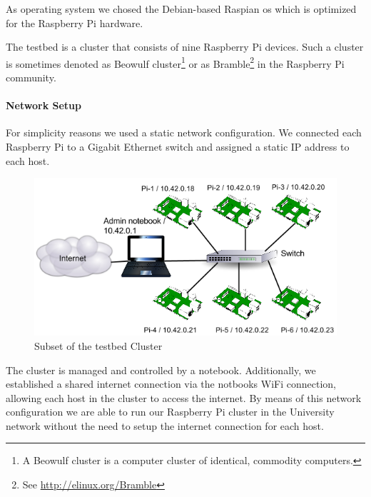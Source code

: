 \documentclass[10pt,a4wide]{article}
\begin{document}
As operating system we chosed the Debian-based Raspian os which is optimized for the Raspberry Pi hardware.


The testbed is a cluster that consists of nine Raspberry Pi devices. Such a cluster is sometimes denoted as Beowulf cluster\footnote{A Beowulf cluster is a computer cluster of identical, commodity computers.} or as Bramble\footnote{See \url{http://elinux.org/Bramble}} in the Raspberry Pi community.


\paragraph{Network Setup}
For simplicity reasons we used a static network configuration. We connected each Raspberry Pi to a Gigabit Ethernet switch and assigned a static IP address to each host. 

\begin{figure}[!htb]
\includegraphics[scale=0.45]{png/pi_cluster.png} 
\centering
\caption{Subset of the testbed Cluster}
\end{figure}

The cluster is managed and controlled by a notebook. Additionally, we established a shared internet connection via the notbooks WiFi connection, allowing each host in the cluster to access the internet. 
By means of this network configuration we are able to run our Raspberry Pi cluster in the University network without the need to setup the internet connection for each host.
\end{document}
